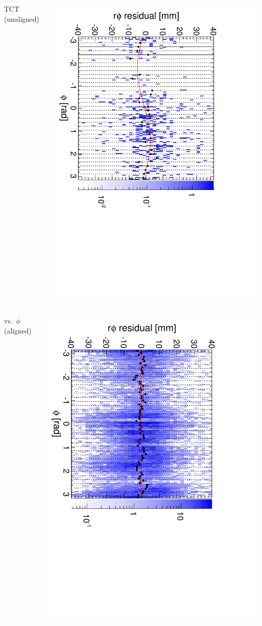 \documentclass[compress]{beamer}
\begin{document}
\begin{frame}
\begin{columns}
\centering TCT (unaligned)

\includegraphics[height=\linewidth, angle=90]{diskiter01_p2to1outer_TST.pdf}
\end{columns}

\begin{columns}
\centering vs.\ $\phi$ (aligned)

\includegraphics[height=\linewidth, angle=90]{diskiter02_p2to1outer.pdf}


\end{columns}
\end{frame}
\end{document}
